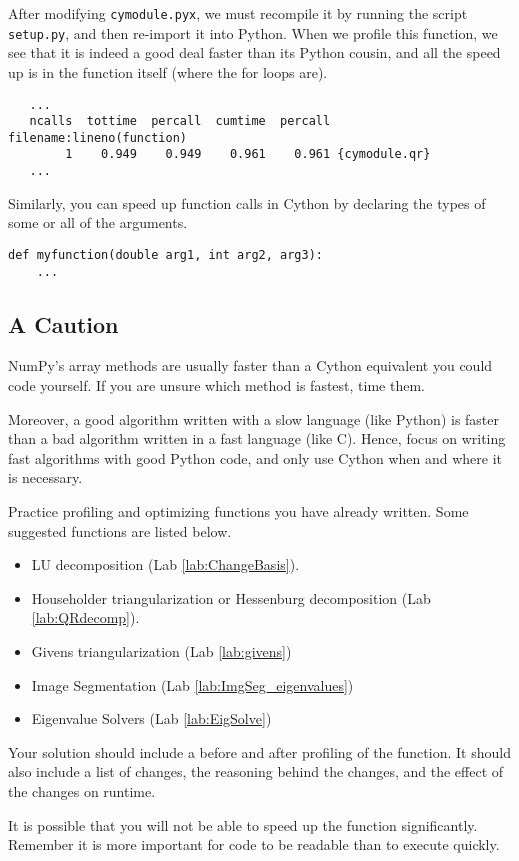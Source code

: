 After modifying \texttt{cymodule.pyx}, we must recompile it by running the script \texttt{setup.py}, and then re-import it into Python.
When we profile this function, we see that it is indeed a good deal faster than its Python cousin, and all the speed up is in the function itself (where the for loops are).
{\scriptsize
\begin{verbatim}
   ...
   ncalls  tottime  percall  cumtime  percall filename:lineno(function)
        1    0.949    0.949    0.961    0.961 {cymodule.qr}
   ...
       \end{verbatim}
       }
Similarly, you can speed up function calls in Cython by declaring the types of some or all of the arguments.
\begin{lstlisting}
def myfunction(double arg1, int arg2, arg3):
    ...
\end{lstlisting}


\subsection*{A Caution}
NumPy's array methods are usually faster than a Cython equivalent you could code yourself.
If you are unsure which method is fastest, time them.

Moreover, a good algorithm written with a slow language (like Python) is faster than a bad algorithm written in a fast language (like C).
Hence, focus on writing fast algorithms with good Python code, and only use Cython when and where it is necessary.





\begin{problem}
Practice profiling and optimizing functions you have already written.
Some suggested functions are listed below.
\begin{itemize}
\item LU decomposition (Lab \ref{lab:ChangeBasis}). 
\item Householder triangularization or Hessenburg decomposition (Lab \ref{lab:QRdecomp}).
\item Givens triangularization (Lab \ref{lab:givens})
\item Image Segmentation (Lab \ref{lab:ImgSeg_eigenvalues})
\item Eigenvalue Solvers (Lab \ref{lab:EigSolve})
\end{itemize}
Your solution should include a before and after profiling of the function.  
It should also include a list of changes, the reasoning behind the changes, and the effect of the changes on runtime.  

It is possible that you will not be able to speed up the function significantly. 
Remember it is more important for code to be readable than to execute quickly.
\end{problem}




















